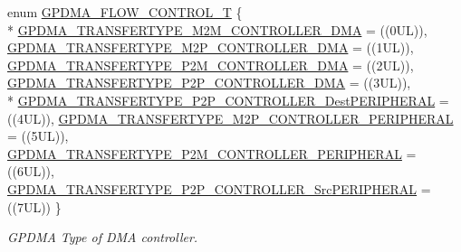 \begin{DoxyCompactItemize}
enum \hyperlink{group___g_p_d_m_a__18_x_x__43_x_x_ga2cb59b641cd840f22780c44be1208133}{G\+P\+D\+M\+A\+\_\+\+F\+L\+O\+W\+\_\+\+C\+O\+N\+T\+R\+O\+L\+\_\+T} \{ \\*
\hyperlink{group___g_p_d_m_a__18_x_x__43_x_x_gga2cb59b641cd840f22780c44be1208133ae5ff87adb4451f2a695c9d21c3c52c59}{G\+P\+D\+M\+A\+\_\+\+T\+R\+A\+N\+S\+F\+E\+R\+T\+Y\+P\+E\+\_\+\+M2\+M\+\_\+\+C\+O\+N\+T\+R\+O\+L\+L\+E\+R\+\_\+\+D\+MA} = ((0\+UL)), 
\hyperlink{group___g_p_d_m_a__18_x_x__43_x_x_gga2cb59b641cd840f22780c44be1208133a331474560497f41cfe921b0e55ce8722}{G\+P\+D\+M\+A\+\_\+\+T\+R\+A\+N\+S\+F\+E\+R\+T\+Y\+P\+E\+\_\+\+M2\+P\+\_\+\+C\+O\+N\+T\+R\+O\+L\+L\+E\+R\+\_\+\+D\+MA} = ((1\+UL)), 
\hyperlink{group___g_p_d_m_a__18_x_x__43_x_x_gga2cb59b641cd840f22780c44be1208133aa2ae587fb924cb679f51250470927e34}{G\+P\+D\+M\+A\+\_\+\+T\+R\+A\+N\+S\+F\+E\+R\+T\+Y\+P\+E\+\_\+\+P2\+M\+\_\+\+C\+O\+N\+T\+R\+O\+L\+L\+E\+R\+\_\+\+D\+MA} = ((2\+UL)), 
\hyperlink{group___g_p_d_m_a__18_x_x__43_x_x_gga2cb59b641cd840f22780c44be1208133a29ec59e967f3a1841002ef740552c1d5}{G\+P\+D\+M\+A\+\_\+\+T\+R\+A\+N\+S\+F\+E\+R\+T\+Y\+P\+E\+\_\+\+P2\+P\+\_\+\+C\+O\+N\+T\+R\+O\+L\+L\+E\+R\+\_\+\+D\+MA} = ((3\+UL)), 
\\*
\hyperlink{group___g_p_d_m_a__18_x_x__43_x_x_gga2cb59b641cd840f22780c44be1208133a176e307292918213de220bdae957ad6d}{G\+P\+D\+M\+A\+\_\+\+T\+R\+A\+N\+S\+F\+E\+R\+T\+Y\+P\+E\+\_\+\+P2\+P\+\_\+\+C\+O\+N\+T\+R\+O\+L\+L\+E\+R\+\_\+\+Dest\+P\+E\+R\+I\+P\+H\+E\+R\+AL} = ((4\+UL)), 
\hyperlink{group___g_p_d_m_a__18_x_x__43_x_x_gga2cb59b641cd840f22780c44be1208133a640177df7a3c696a9ccab9a09dcdbc0c}{G\+P\+D\+M\+A\+\_\+\+T\+R\+A\+N\+S\+F\+E\+R\+T\+Y\+P\+E\+\_\+\+M2\+P\+\_\+\+C\+O\+N\+T\+R\+O\+L\+L\+E\+R\+\_\+\+P\+E\+R\+I\+P\+H\+E\+R\+AL} = ((5\+UL)), 
\hyperlink{group___g_p_d_m_a__18_x_x__43_x_x_gga2cb59b641cd840f22780c44be1208133aaeaf72b20cee326722ee7650405e2e43}{G\+P\+D\+M\+A\+\_\+\+T\+R\+A\+N\+S\+F\+E\+R\+T\+Y\+P\+E\+\_\+\+P2\+M\+\_\+\+C\+O\+N\+T\+R\+O\+L\+L\+E\+R\+\_\+\+P\+E\+R\+I\+P\+H\+E\+R\+AL} = ((6\+UL)), 
\hyperlink{group___g_p_d_m_a__18_x_x__43_x_x_gga2cb59b641cd840f22780c44be1208133a4615bdb6a415ddc02f8eab20a700a17d}{G\+P\+D\+M\+A\+\_\+\+T\+R\+A\+N\+S\+F\+E\+R\+T\+Y\+P\+E\+\_\+\+P2\+P\+\_\+\+C\+O\+N\+T\+R\+O\+L\+L\+E\+R\+\_\+\+Src\+P\+E\+R\+I\+P\+H\+E\+R\+AL} = ((7\+UL))
 \}\begin{DoxyCompactList}\small\item\em G\+P\+D\+MA Type of D\+MA controller. \end{DoxyCompactList}
\end{DoxyCompactItemize}
